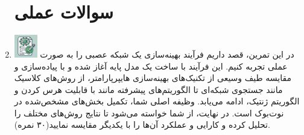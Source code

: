 \documentclass[12pt]{article}
\begin{document}
\begin{enumerate}
   
    \section*{سوالات عملی} 
    \item \includegraphics[width=1cm]{figs/Allowed_with_contributino.jpg}
    در این تمرین، قصد داریم فرآیند بهینه‌سازی یک شبکه عصبی را به صورت عملی تجربه کنیم. این فرآیند با ساخت یک مدل پایه  آغاز شده و با پیاده‌سازی و مقایسه طیف وسیعی از تکنیک‌های بهینه‌سازی هایپرپارامتر، از روش‌های کلاسیک مانند جستجوی شبکه‌ای تا الگوریتم‌های پیشرفته مانند  با قابلیت هرس کردن و الگوریتم ژنتیک، ادامه می‌یابد.
    وظیفه اصلی شما، تکمیل بخش‌های مشخص‌شده در نوت‌بوک  است. در نهایت، از شما خواسته می‌شود تا نتایج روش‌های مختلف را تحلیل کرده و کارایی و عملکرد آن‌ها را با یکدیگر مقایسه نمایید(۳۰ نمره).




\end{enumerate}
\end{document}
